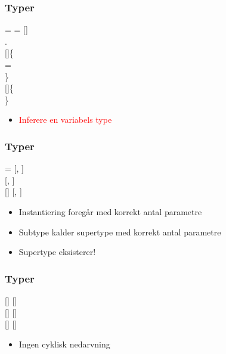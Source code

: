 \begin{frame}[fragile]
\frametitle{Typer}
  =   = [] \\
\qquad \qquad \qquad {} . \\
 []\{ \\
  \quad {}  =  \\
\} \\
 []\{\\

\}

\begin{itemize}                                  
\item \textcolor{red}{Inferere en variabels type}
\end{itemize}

\end{frame}

\begin{frame}[fragile]
\frametitle{Typer}

  = [, ]\\
 [, ]\\
 []  [, ]\\

\begin{itemize}                                  
\item Instantiering foregår med korrekt antal parametre
\item Subtype kalder supertype med korrekt antal parametre
\item Supertype eksisterer!
\end{itemize}

\end{frame}

\begin{frame}[fragile]
\frametitle{Typer}
 []  []\\
 []  []\\
 []  []\\

\begin{itemize}                                 
\item Ingen cyklisk nedarvning
\end{itemize}
\end{frame}

